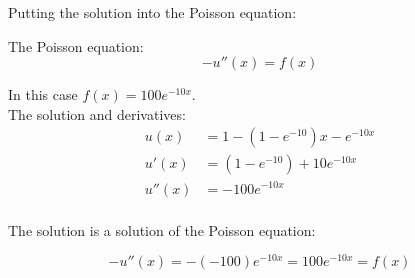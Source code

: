 Putting the solution into the Poisson equation:

The Poisson equation:
\[ -u''(x) = f(x)\]

In this case $f(x) = 100 e^{-10x}$.\\

The solution and derivatives:
\begin{align*}
u(x) &= 1 - \left(1-e^{-10}\right) x - e^{-10x}\\
u'(x) &= \left(1-e^{-10}\right)+ 10 e^{-10x}\\ 
u''(x) &= -100 e^{-10x}\\
\end{align*}

The solution is a solution of the Poisson equation:

\[ -u''(x) = -(-100) e^{-10x} = 100 e^{-10x} = f(x) \]
